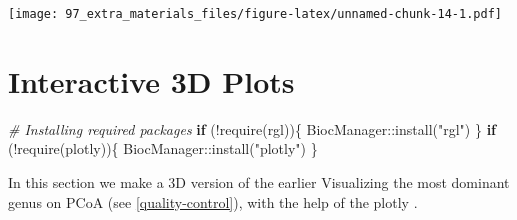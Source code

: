 \documentclass[
]{book}
\newenvironment{Shaded}{\begin{snugshade}}{\end{snugshade}}
\newcommand{\AttributeTok}[1]{\textcolor[rgb]{0.77,0.63,0.00}{#1}}
\newcommand{\CommentTok}[1]{\textcolor[rgb]{0.56,0.35,0.01}{\textit{#1}}}
\newcommand{\ControlFlowTok}[1]{\textcolor[rgb]{0.13,0.29,0.53}{\textbf{#1}}}
\newcommand{\FunctionTok}[1]{\textcolor[rgb]{0.00,0.00,0.00}{#1}}
\newcommand{\NormalTok}[1]{#1}
\newcommand{\SpecialCharTok}[1]{\textcolor[rgb]{0.00,0.00,0.00}{#1}}
\newcommand{\StringTok}[1]{\textcolor[rgb]{0.31,0.60,0.02}{#1}}
\begin{document}
\texttt{[image: 97\_extra\_materials\_files/figure-latex/unnamed-chunk-14-1.pdf]}

\hypertarget{interactive-3d-plots}{%
\section{Interactive 3D Plots}\label{interactive-3d-plots}}

\begin{Shaded}
\begin{Highlighting}[]
\CommentTok{\# Installing required packages}
\ControlFlowTok{if}\NormalTok{ (}\SpecialCharTok{!}\FunctionTok{require}\NormalTok{(rgl))\{}
\NormalTok{  BiocManager}\SpecialCharTok{::}\FunctionTok{install}\NormalTok{(}\StringTok{"rgl"}\NormalTok{)  }
\NormalTok{\}}
\ControlFlowTok{if}\NormalTok{ (}\SpecialCharTok{!}\FunctionTok{require}\NormalTok{(plotly))\{}
\NormalTok{  BiocManager}\SpecialCharTok{::}\FunctionTok{install}\NormalTok{(}\StringTok{"plotly"}\NormalTok{)  }
\NormalTok{\}}
\end{Highlighting}
\end{Shaded}

\begin{Shaded}
\end{Shaded}

In this section we make a 3D version of the earlier Visualizing the most dominant genus on PCoA (see \ref{quality-control}), with the help of the plotly \citep{Sievert2020}.
\end{document}

